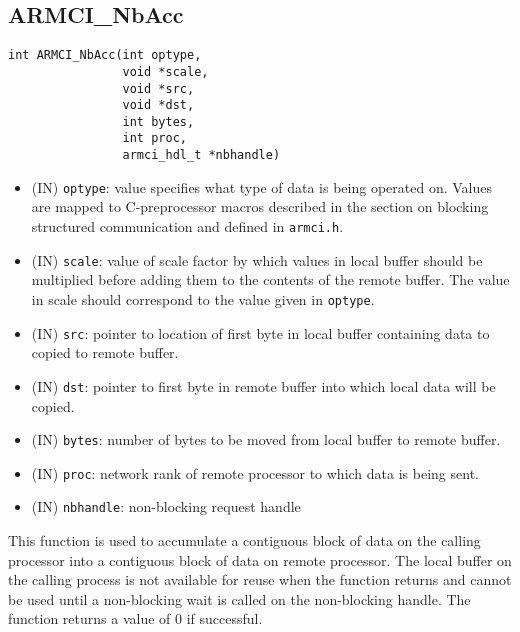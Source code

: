 \documentclass[12pt]{article}
\begin{document}
\subsection{ARMCI\_NbAcc}
\begin{verbatim}
int ARMCI_NbAcc(int optype,
                void *scale,
                void *src,
                void *dst,
                int bytes,
                int proc,
                armci_hdl_t *nbhandle)
\end{verbatim}
\begin{itemize}
\item (IN) \texttt{optype}: value specifies what type of data is being operated
on. Values are mapped to C-preprocessor macros described in the section on
blocking structured communication and defined in \texttt{armci.h}.
\item (IN) \texttt{scale}: value of scale factor by which values in local buffer
should be multiplied before adding them to the contents of the remote buffer.
The value in scale should correspond to the value given in \texttt{optype}.
\item (IN) \texttt{src}: pointer to location of first byte in local buffer
containing data to copied to remote buffer.
\item (IN) \texttt{dst}: pointer to first byte in remote buffer into which local
data will be copied.
\item (IN) \texttt{bytes}: number of bytes to be moved from local buffer to
remote buffer.
\item (IN) \texttt{proc}: network rank of remote processor to which data is
being sent.
\item (IN) \texttt{nbhandle}: non-blocking request handle
\end{itemize}
This function is used to accumulate a contiguous block of data on the calling
processor into a contiguous block of data on remote processor. The local buffer on
the calling process is not available for reuse when the function returns and cannot
be used until a non-blocking wait is called on the non-blocking handle. The
function returns a value of 0 if successful.
\end{document}
